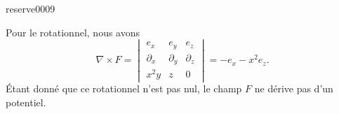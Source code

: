 
\begin{corrige}{reserve0009}

    Pour le rotationnel, nous avons
    \begin{equation}
        \nabla\times F=\begin{vmatrix}
            e_x    &   e_y    &   e_z    \\
            \partial_x    &   \partial_y    &   \partial_z    \\
            x^2y    &   z    &   0
        \end{vmatrix}=-e_x-x^2e_z.
    \end{equation}
    Étant donné que ce rotationnel n'est pas nul, le champ \( F\) ne dérive pas d'un potentiel.

\end{corrige}
